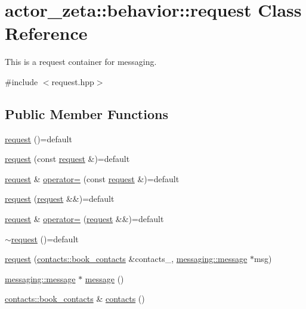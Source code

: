 \hypertarget{classactor__zeta_1_1behavior_1_1request}{}\section{actor\+\_\+zeta\+:\+:behavior\+:\+:request Class Reference}
\label{classactor__zeta_1_1behavior_1_1request}


This is a request container for messaging.  




{\ttfamily \#include $<$request.\+hpp$>$}

\subsection*{Public Member Functions}
\begin{DoxyCompactItemize}
\item 
\hyperlink{classactor__zeta_1_1behavior_1_1request_aa63a875178ab42de4ad9da3f375e4738}{request} ()=default
\item 
\hyperlink{classactor__zeta_1_1behavior_1_1request_a383424eac1d1c8652c8750d4d6e53f5c}{request} (const \hyperlink{classactor__zeta_1_1behavior_1_1request}{request} \&)=default
\item 
\hyperlink{classactor__zeta_1_1behavior_1_1request}{request} \& \hyperlink{classactor__zeta_1_1behavior_1_1request_adb7544a3e7e43b00f458b794cab09227}{operator=} (const \hyperlink{classactor__zeta_1_1behavior_1_1request}{request} \&)=default
\item 
\hyperlink{classactor__zeta_1_1behavior_1_1request_a815b216b0531fae8e7aa4670fa243176}{request} (\hyperlink{classactor__zeta_1_1behavior_1_1request}{request} \&\&)=default
\item 
\hyperlink{classactor__zeta_1_1behavior_1_1request}{request} \& \hyperlink{classactor__zeta_1_1behavior_1_1request_ae254fec16d1b066e99d56d56a950bbef}{operator=} (\hyperlink{classactor__zeta_1_1behavior_1_1request}{request} \&\&)=default
\item 
\hyperlink{classactor__zeta_1_1behavior_1_1request_a1394a62c51722de66eae954027331d8d}{$\sim$request} ()=default
\item 
\hyperlink{classactor__zeta_1_1behavior_1_1request_ab891918a801fb30cdef7b14737d6945c}{request} (\hyperlink{classactor__zeta_1_1contacts_1_1book__contacts}{contacts\+::book\+\_\+contacts} \&contacts\+\_\+, \hyperlink{classactor__zeta_1_1messaging_1_1message}{messaging\+::message} $\ast$msg)
\item 
\hyperlink{classactor__zeta_1_1messaging_1_1message}{messaging\+::message} $\ast$ \hyperlink{classactor__zeta_1_1behavior_1_1request_a3bd267cd2f121a5b57e616572ddbf762}{message} ()
\item 
\hyperlink{classactor__zeta_1_1contacts_1_1book__contacts}{contacts\+::book\+\_\+contacts} \& \hyperlink{classactor__zeta_1_1behavior_1_1request_ae94a34415643bf735bf6295857f470bf}{contacts} ()
\end{DoxyCompactItemize}


